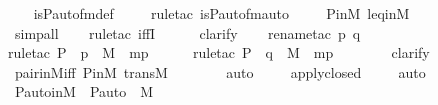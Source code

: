 \begin{isabellebody}
\ \ \isamarkupfalse%
\ is{\isacharunderscore}{\kern0pt}P{\isacharunderscore}{\kern0pt}auto{\isacharunderscore}{\kern0pt}fm{\isacharunderscore}{\kern0pt}def\ \isanewline
\ \ \ \isamarkupfalse%
{\isacharparenleft}{\kern0pt}rule{\isacharunderscore}{\kern0pt}tac\ is{\isacharunderscore}{\kern0pt}P{\isacharunderscore}{\kern0pt}auto{\isacharunderscore}{\kern0pt}fm{\isacharunderscore}{\kern0pt}auto{\isacharparenright}{\kern0pt}\ \isanewline
\ \ \isamarkupfalse%
\ P{\isacharunderscore}{\kern0pt}in{\isacharunderscore}{\kern0pt}M\ leq{\isacharunderscore}{\kern0pt}in{\isacharunderscore}{\kern0pt}M\ \isanewline
\ \ \ \ \ \ \isamarkupfalse%
\ simp{\isacharunderscore}{\kern0pt}all\ \isanewline
\ \ \isamarkupfalse%
{\isacharparenleft}{\kern0pt}rule{\isacharunderscore}{\kern0pt}tac\ iffI{\isacharparenright}{\kern0pt}\ \isanewline
\ \ \ \isamarkupfalse%
\ clarify\ \isanewline
\ \ \isamarkupfalse%
{\isacharparenleft}{\kern0pt}rename{\isacharunderscore}{\kern0pt}tac\ p\ q{\isacharparenright}{\kern0pt}\isanewline
\ \ \ \isamarkupfalse%
{\isacharparenleft}{\kern0pt}rule{\isacharunderscore}{\kern0pt}tac\ P{\isacharequal}{\kern0pt}{\isachardoublequoteopen}{\isasympi}\ {\isacharbackquote}{\kern0pt}\ p\ {\isasymin}\ M{\isachardoublequoteclose}\ \ mp{\isacharparenright}{\kern0pt}\ \isanewline
\ \ \ \ \isamarkupfalse%
{\isacharparenleft}{\kern0pt}rule{\isacharunderscore}{\kern0pt}tac\ P{\isacharequal}{\kern0pt}{\isachardoublequoteopen}{\isasympi}\ {\isacharbackquote}{\kern0pt}\ q\ {\isasymin}\ M{\isachardoublequoteclose}\ \ mp{\isacharparenright}{\kern0pt}\ \isanewline
\ \ \ \ \ \isamarkupfalse%
\ clarify\ \isanewline
\ \ \isamarkupfalse%
\ pair{\isacharunderscore}{\kern0pt}in{\isacharunderscore}{\kern0pt}M{\isacharunderscore}{\kern0pt}iff\ P{\isacharunderscore}{\kern0pt}in{\isacharunderscore}{\kern0pt}M\ transM\ \isanewline
\ \ \ \ \ \isamarkupfalse%
\ auto\ \isanewline
\ \ \isamarkupfalse%
\ apply{\isacharunderscore}{\kern0pt}closed\ \isanewline
\ \ \isamarkupfalse%
\ auto%
\endisatagproof
{\isafoldproof}%
%
\isadelimproof
\isanewline
%
\endisadelimproof
\isanewline
{}\isamarkupfalse%
\ P{\isacharunderscore}{\kern0pt}auto{\isacharunderscore}{\kern0pt}in{\isacharunderscore}{\kern0pt}M\ {\isacharcolon}{\kern0pt}\ {\isachardoublequoteopen}P{\isacharunderscore}{\kern0pt}auto\ {\isasymin}\ M{\isachardoublequoteclose}\ \isanewline

\end{isabellebody}
